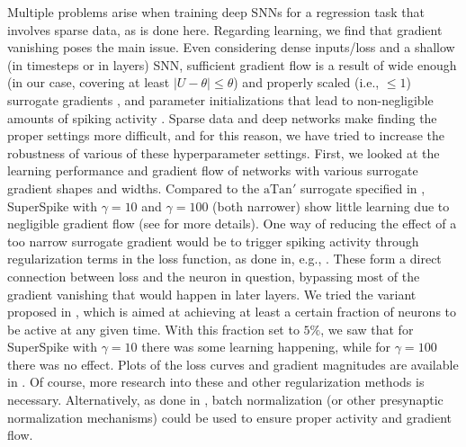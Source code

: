 Multiple problems arise when training deep SNNs for a regression task that involves sparse data, as is done here. Regarding learning, we find that gradient vanishing poses the main issue. Even considering dense inputs/loss and a shallow (in timesteps or in layers) SNN, sufficient gradient flow is a result of wide enough (in our case, covering at least $\lvert U - \theta\rvert \leq \theta$) and properly scaled (i.e., $\leq 1$) surrogate gradients \cite{ledinauskas2020training,yin2021accurate,zenke2021remarkable}, and parameter initializations that lead to non-negligible amounts of spiking activity \cite{zenke2021remarkable}. Sparse data and deep networks make finding the proper settings more difficult, and for this reason, we have tried to increase the robustness of various of these hyperparameter settings.
First, we looked at the learning performance and gradient flow of networks with various surrogate gradient shapes and widths. Compared to the $\text{aTan}'$ surrogate specified in , SuperSpike \cite{zenke2018superspike} with $\gamma = 10$ and $\gamma=100$ (both narrower) show little learning due to negligible gradient flow (see  for more details). One way of reducing the effect of a too narrow surrogate gradient would be to trigger spiking activity through regularization terms in the loss function, as done in, e.g., \cite{bellec2020solution,zenke2021remarkable}. These form a direct connection between loss and the neuron in question, bypassing most of the gradient vanishing that would happen in later layers. We tried the variant proposed in \cite{zenke2021remarkable}, which is aimed at achieving at least a certain fraction of neurons to be active at any given time. With this fraction set to $5\%$, we saw that for SuperSpike with $\gamma=10$ there was some learning happening, while for $\gamma=100$ there was no effect. Plots of the loss curves and gradient magnitudes are available in . Of course, more research into these and other regularization methods is necessary. Alternatively, as done in \cite{ledinauskas2020training}, batch normalization (or other presynaptic normalization mechanisms) could be used to ensure proper activity and gradient flow.

